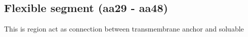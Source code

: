 \subsection{Flexible segment (aa29 - aa48)}

This is region act as connection between transmembrane anchor and soluable 
